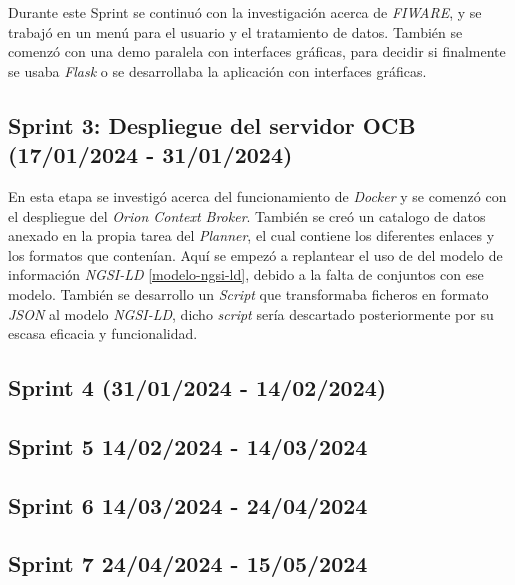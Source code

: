 Durante este Sprint se continuó con la investigación acerca de \textit{FIWARE}, y se trabajó en un menú para el usuario y el tratamiento de datos.
También se comenzó con una demo paralela con interfaces gráficas, para decidir si finalmente se usaba \textit{Flask} o se desarrollaba la aplicación con interfaces gráficas.


\subsection{Sprint 3: Despliegue del servidor OCB (17/01/2024 - 31/01/2024)}

En esta etapa se investigó acerca del funcionamiento de \textit{Docker} y se comenzó con el despliegue del \textit{Orion Context Broker}.
También se creó un catalogo de datos anexado en la propia tarea del \textit{Planner}, el cual contiene los diferentes enlaces y los formatos que contenían. Aquí se empezó a replantear el uso de del modelo de información \textit{NGSI-LD} \ref{modelo-ngsi-ld}, debido a la falta de conjuntos con ese modelo.
También se desarrollo un \textit{Script} que transformaba ficheros en formato \textit{JSON} al modelo \textit{NGSI-LD}, dicho \textit{script} sería descartado posteriormente por su escasa eficacia y funcionalidad.


\subsection{Sprint 4 (31/01/2024 - 14/02/2024)}



\subsection{Sprint 5 14/02/2024 - 14/03/2024}



\subsection{Sprint 6 14/03/2024 - 24/04/2024}



\subsection{Sprint 7 24/04/2024 - 15/05/2024}

